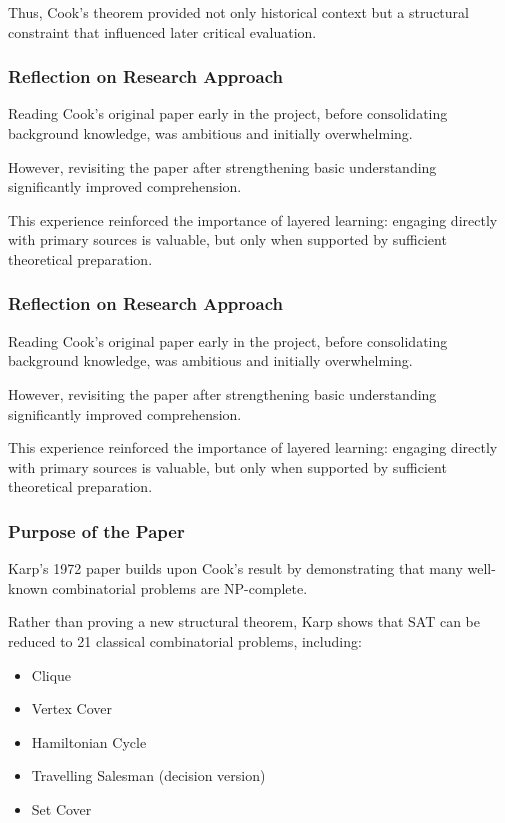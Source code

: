 \documentclass[12pt]{article}
\begin{document}
Thus, Cook's theorem provided not only historical context but a structural constraint that influenced later critical evaluation.

\subsubsection*{Reflection on Research Approach}

Reading Cook's original paper early in the project, before consolidating background knowledge, was ambitious and initially overwhelming.

However, revisiting the paper after strengthening basic understanding significantly improved comprehension.

This experience reinforced the importance of layered learning: engaging directly with primary sources is valuable, but only when supported by sufficient theoretical preparation.

\subsubsection*{Reflection on Research Approach}

Reading Cook's original paper early in the project, before consolidating background knowledge, was ambitious and initially overwhelming.

However, revisiting the paper after strengthening basic understanding significantly improved comprehension.

This experience reinforced the importance of layered learning: engaging directly with primary sources is valuable, but only when supported by sufficient theoretical preparation.

\subsubsection*{Purpose of the Paper}

Karp's 1972 paper builds upon Cook's result by demonstrating that many well-known combinatorial problems are NP-complete.

Rather than proving a new structural theorem, Karp shows that SAT can be reduced to 21 classical combinatorial problems, including:

\begin{itemize}
\item Clique
\item Vertex Cover
\item Hamiltonian Cycle
\item Travelling Salesman (decision version)
\item Set Cover
\end{itemize}
\end{document}
